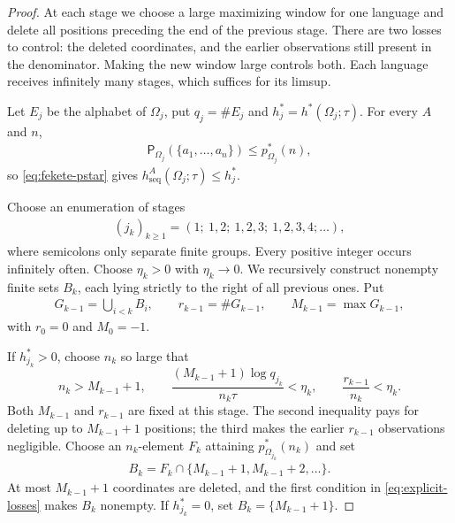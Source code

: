\documentclass[11pt,reqno]{amsart}
\numberwithin{equation}{section}
\theoremstyle{definition}
\theoremstyle{definition}
\newcommand{\Patt}{\mathsf P}
\newcommand{\hseq}{h_{\mathrm{seq}}}
\newcommand{\hpat}{h^{*}}
\begin{document}
\begin{proof}
At each stage we choose a large maximizing window for one language
and delete all positions preceding the end of the previous stage.
There are two losses to control: the deleted coordinates, and the
earlier observations still present in the denominator. Making the
new window large controls both. Each language receives infinitely
many stages, which suffices for its limsup.

Let $E_j$ be the alphabet of $\Omega_j$, put $q_j=\#E_j$ and
$h_j^*=\hpat(\Omega_j;\tau)$.  For every $A$ and $n$,
\begin{align*}
 \Patt_{\Omega_j}(\{a_1,\ldots,a_n\})\le p_{\Omega_j}^*(n),
\end{align*}
so \eqref{eq:fekete-pstar} gives
$\hseq^A(\Omega_j;\tau)\le h_j^*$.

Choose an enumeration of stages
\begin{align*}
 (j_k)_{k\ge1}=(1;\ 1,2;\ 1,2,3;\ 1,2,3,4;\ldots),
\end{align*}
where semicolons only separate finite groups. Every positive integer
occurs infinitely often. Choose $\eta_k>0$ with $\eta_k\to0$.  We recursively
construct nonempty finite sets $B_k$, each lying strictly to the right of all
previous ones.  Put
\begin{align*}
 G_{k-1}=\bigcup_{i<k}B_i,
 \qquad r_{k-1}=\#G_{k-1},
 \qquad M_{k-1}=\max G_{k-1},
\end{align*}
with $r_0=0$ and $M_0=-1$.

If $h_{j_k}^*>0$, choose $n_k$ so large that
\begin{equation}\label{eq:explicit-losses}
 n_k>M_{k-1}+1,
 \qquad
 \frac{(M_{k-1}+1)\log q_{j_k}}{n_k\tau}<\eta_k,
 \qquad
 \frac{r_{k-1}}{n_k}<\eta_k.
\end{equation}
Both $M_{k-1}$ and $r_{k-1}$ are fixed at this stage. The second
inequality pays for deleting up to $M_{k-1}+1$ positions; the third
makes the earlier $r_{k-1}$ observations negligible. Choose an
$n_k$-element $F_k$ attaining $p_{\Omega_{j_k}}^*(n_k)$ and set
\begin{align*}
 B_k=F_k\cap\{M_{k-1}+1,M_{k-1}+2,\ldots\}.
\end{align*}
At most $M_{k-1}+1$ coordinates are deleted, and the first condition in
\eqref{eq:explicit-losses} makes $B_k$ nonempty.  If $h_{j_k}^*=0$, set
$B_k=\{M_{k-1}+1\}$.


\end{proof}
\end{document}
